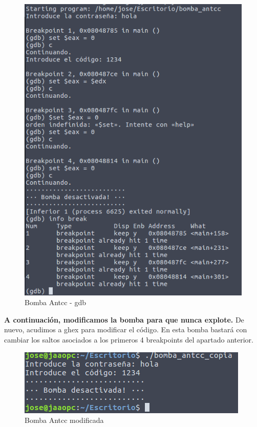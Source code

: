 \documentclass[11pt,a4paper]{article}
\begin{document}
\begin{figure}[H] 
	\centering
	\includegraphics[scale=0.45]{capturas/antcc1.png} 
	\caption{Bomba Antcc - gdb} \label{fig:figura25}
\end{figure}

\textbf{A continuación, modificamos la bomba para que nunca explote.} De nuevo, acudimos a ghex para modificar el código. En esta bomba bastará con cambiar los saltos asociados a los primeros 4 breakpoints del apartado anterior. \\

\begin{figure}[H] 
	\centering
	\includegraphics[scale=0.45]{capturas/antcc2.png} 
	\caption{Bomba Antcc modificada} \label{fig:figura25}
\end{figure}
\end{document}
